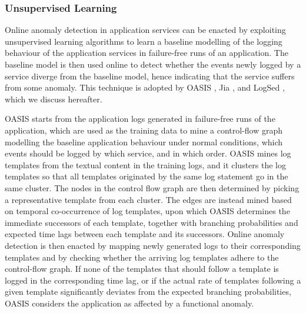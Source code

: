 \subsubsection{Unsupervised Learning}
Online anomaly detection in application services can be enacted by exploiting unsupervised learning algorithms to learn a baseline modelling of the logging behaviour of the application services in failure-free runs of an application.
The baseline model is then used online to detect whether the events newly logged by a service diverge from the baseline model, hence indicating that the service suffers from some anomaly.
This technique is adopted by OASIS \cite{38_Nandi2016_AnomalyDetectionControlFlowGraphMining}, Jia \etal \cite{31_Jia2017_AnomalyDiagnosisHybridGraphModel}, and LogSed \etal \cite{32_Jia2017_LogSed}, which we discuss hereafter.

OASIS \cite{38_Nandi2016_AnomalyDetectionControlFlowGraphMining} starts from the application logs generated in failure-free runs of the application, which are used as the training data to mine a control-flow graph modelling the baseline application behaviour under normal conditions, \viz which events should be logged by which service, and in which order.
OASIS \cite{38_Nandi2016_AnomalyDetectionControlFlowGraphMining} mines log templates from the textual content in the training logs, and it clusters the log templates so that all templates originated by the same log statement go in the same cluster.
The nodes in the control flow graph are then determined by picking a representative template from each cluster.
The edges are instead mined based on temporal co-occurrence of log templates, upon which OASIS \cite{38_Nandi2016_AnomalyDetectionControlFlowGraphMining} determines the immediate successors of each template, together with branching probabilities and expected time lags between each template and its successors.
Online anomaly detection is then enacted by mapping newly generated logs to their corresponding templates and by checking whether the arriving log templates adhere to the control-flow graph.
If none of the templates that should follow a template is logged in the corresponding time lag, or if the actual rate of templates following a given template significantly deviates from the expected branching probabilities, OASIS \cite{38_Nandi2016_AnomalyDetectionControlFlowGraphMining} considers the application as affected by a functional anomaly.


